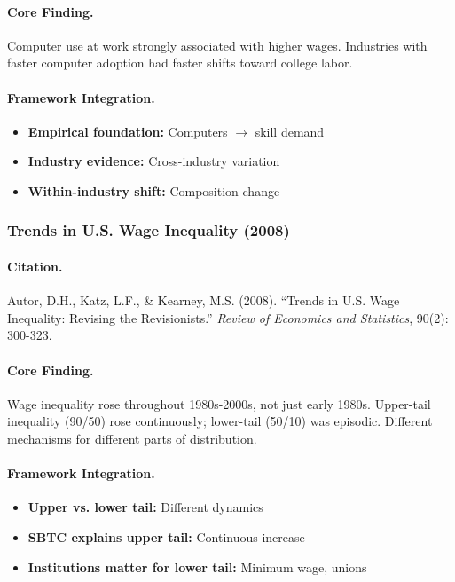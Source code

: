 \paragraph{Core Finding.}
Computer use at work strongly associated with higher wages. Industries
with faster computer adoption had faster shifts toward college labor.

\paragraph{Framework Integration.}
\begin{itemize}
  \item \textbf{Empirical foundation:} Computers $\to$ skill demand
  \item \textbf{Industry evidence:} Cross-industry variation
  \item \textbf{Within-industry shift:} Composition change
\end{itemize}

\subsubsection{Trends in U.S. Wage Inequality (2008)}

\paragraph{Citation.}
Autor, D.H., Katz, L.F., \& Kearney, M.S. (2008). ``Trends in U.S.
Wage Inequality: Revising the Revisionists.''
\emph{Review of Economics and Statistics}, 90(2): 300-323.

\paragraph{Core Finding.}
Wage inequality rose throughout 1980s-2000s, not just early 1980s.
Upper-tail inequality (90/50) rose continuously; lower-tail (50/10)
was episodic. Different mechanisms for different parts of distribution.

\paragraph{Framework Integration.}
\begin{itemize}
  \item \textbf{Upper vs. lower tail:} Different dynamics
  \item \textbf{SBTC explains upper tail:} Continuous increase
  \item \textbf{Institutions matter for lower tail:} Minimum wage, unions
\end{itemize}

